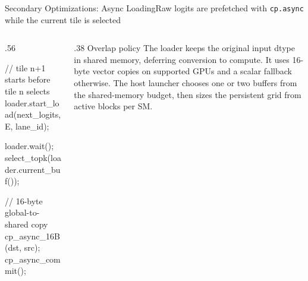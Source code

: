 \documentclass[aspectratio=169,10pt]{beamer}
\renewcommand{\NvidiaSource}[1]{}
\begin{document}
\begin{frame}[fragile]{Secondary Optimizations: Async Loading}{Raw logits are prefetched with \texttt{cp.async} while the current tile is selected}
  \NvidiaSource{TE commit \texttt{69a7c46f};
    \texttt{TE/.../fused\_router/async\_loader.h}}
  \begin{columns}[T,onlytextwidth]
    \begin{column}{.56\textwidth}
      \begin{NvidiaCode}[language=NvidiaCUDA,basicstyle=\ttfamily\fontsize{6.7}{7.9}\selectfont]
// tile n+1 starts before tile n selects
loader.start_load(next_logits, E, lane_id);

loader.wait();
select_topk(loader.current_buf());

// 16-byte global-to-shared copy
cp_async_16B(dst, src);
cp_async_commit();
      \end{NvidiaCode}
    \end{column}
    \begin{column}{.38\textwidth}
      {\NvidiaSansMedium Overlap policy}\NvidiaTightRule{.6pt}\vspace{.07in}
      \small The loader keeps the original input dtype in shared memory, deferring conversion to
      compute. It uses 16-byte vector copies on supported GPUs and a scalar fallback otherwise.
      \vspace{.10in}
      \small The host launcher chooses one or two buffers from the shared-memory budget, then
      sizes the persistent grid from active blocks per SM.
    \end{column}
  \end{columns}
\end{frame}
\end{document}

